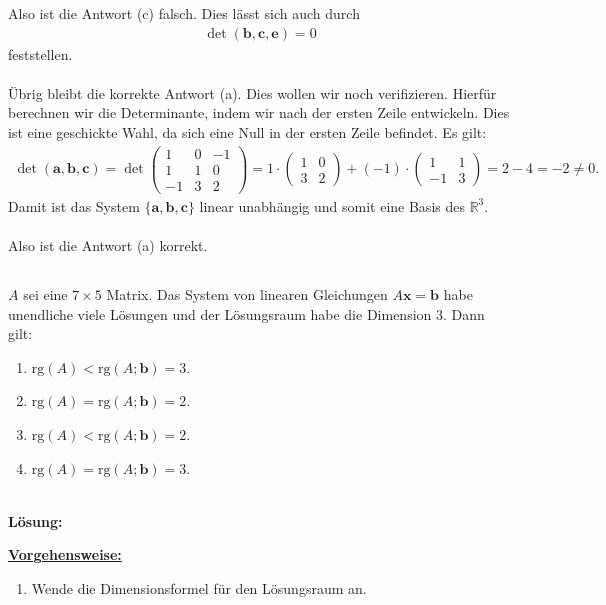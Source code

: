 Also ist die Antwort (c) falsch.
Dies lässt sich auch durch
\begin{align*}
\det(\textbf{b}, \textbf{c}, \textbf{e} ) = 0
\end{align*}
feststellen.\\
\\
Übrig bleibt die korrekte Antwort (a).
Dies wollen wir noch verifizieren. Hierfür berechnen wir die Determinante, indem wir nach der ersten Zeile entwickeln.
Dies ist eine geschickte Wahl, da sich eine Null in der ersten Zeile befindet. Es gilt:
\begin{align*}
\det (\textbf{a},\textbf{b}, \textbf{c})
=
\det \begin{pmatrix}
1 & 0 & -1\\
1 & 1 & 0 \\
-1 & 3 & 2 
\end{pmatrix}
=
1 \cdot
\begin{pmatrix}
1 & 0 \\
3 & 2
\end{pmatrix}
+ (-1) \cdot 
\begin{pmatrix}
1 & 1 \\
-1 & 3
\end{pmatrix}
=
2 - 4 = -2 \neq 0.
\end{align*}
Damit ist das System $ \lbrace \textbf{a}, \textbf{b} , \textbf{c} \rbrace  $ linear unabhängig und somit eine Basis des $ \mathbb{R}^3 $.\\
\\
Also ist die Antwort (a) korrekt.
\newpage

\subsection*{}
$ A $ sei eine $ 7 \times 5 $ Matrix. Das System von linearen Gleichungen $ A \textbf{x} = \textbf{b} $ habe unendliche viele Lösungen und der Lösungsraum habe die Dimension $ 3 $. Dann gilt:
\renewcommand{\labelenumi}{(\alph{enumi})}
\begin{enumerate}
	\item 
	$ \mathrm{rg}(A)< \mathrm{rg}(A;\textbf{b} ) =3 $.
	\item
	$ \mathrm{rg}(A)= \mathrm{rg}(A;\textbf{b} ) =2 $.
	
	\item
	$ \mathrm{rg}(A)< \mathrm{rg}(A;\textbf{b} ) =2 $.
	\item
	$ \mathrm{rg}(A)= \mathrm{rg}(A;\textbf{b} ) =3 $.
\end{enumerate}
\ \\
\textbf{Lösung:}
\begin{mdframed}
	\underline{\textbf{Vorgehensweise:}}
	\renewcommand{\labelenumi}{\theenumi.}
	\begin{enumerate}
		\item Wende die Dimensionsformel für den Lösungsraum an.
	\end{enumerate}
\end{mdframed}

